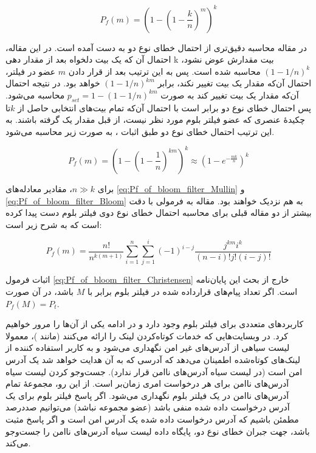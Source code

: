 \begin{equation}
P_f(m) = \left(1-\left(1-\frac{k}{n}\right)^{m}\right)^k \label{eq:Pf_of_bloom_filter_Bloom}
\end{equation}

در مقاله \cite{Mullin1983} محاسبه دقیق‌تری از احتمال خطای نوع دو به دست آمده است. در این مقاله، احتمال آن که یک بیت دلخواه بعد از مقدار دهی k بیت مقدارش عوض نشود،
$(1-1/n)^k$
محاسبه شده است. پس به این ترتیب بعد از قرار دادن $m$ عضو در فیلتر، احتمال آن‌که مقدار یک بیت تغییر نکند، برابر 
$(1-1/n)^{km}$
خواهد بود. در نتیجه احتمال آن‌که مقدار یک بیت تغییر کند به صورت 
$p_{set} = 1-(1-1/n)^{km}$
محاسبه می‌شود. پس احتمال خطای نوع دو برابر است با احتمال آن‌که تمام بیت‌های انتخابی حاصل از $k$تا چکیدهٔ عنصری که عضو فیلتر بلوم مورد نظر نیست،‌ از قبل مقدار یک گرفته باشند. به این ترتیب احتمال خطای نوع دو طبق اثبات \cite{Mullin1983}، به صورت زیر محاسبه می‌شود.

\begin{equation}
P_f(m) = \left(1-\left(1-\frac{1}{n}\right)^{km}\right)^k \approx \left(1-e^{-\frac{mk}{n}}\right)^k
\label{eq:Pf_of_bloom_filter_Mullin}
\end{equation}

برای $n\gg k$، مقادیر معادله‌های  \eqref{eq:Pf_of_bloom_filter_Mullin} و \eqref{eq:Pf_of_bloom_filter_Bloom} به هم نزدیک خواهند بود. مقاله \cite{Christensen2010} به فرمولی با دقت بیشتر از دو مقاله قبلی برای محاسبه احتمال خطای نوع دوی فیلتر بلوم دست پیدا کرده است که به شرح زیر است:

\begin{equation}
P_f(m) = \frac{n!}{n^{k(m+1)}} \sum_{i=1}^{n} \sum_{j=1}^{i} (-1)^{i-j} \frac{j^{km}i^k}{(n-i)!j!(i-j)!}
\label{eq:Pf_of_bloom_filter_Christensen}
\end{equation}


اثبات فرمول \eqref{eq:Pf_of_bloom_filter_Christensen} خارج از بحث این پایان‌نامه است. اگر تعداد پیام‌های قرارداده شده در فیلتر بلوم برابر با $M$ باشد، در آن صورت 
$P_f(M)=P_t$.


کاربرد‌های متعددی برای فیلتر بلوم وجود دارد و در ادامه یکی از آن‌ها را مرور خواهیم کرد. در وبسایت‌هایی که خدمات کوتاه‌کردن لینک را ارائه می‌کنند (مانند \cite{Bitly.comTeam2020})، معمولا لیست سیاهی از آدرس‌های غیر امن نگهداری می‌شود و به کاربر استفاده کننده از لینک‌های کوتاه‌شده اطمینان می‌دهد که آدرسی که به آن هدایت خواهد شد یک آدرس امن است (در لیست سیاه آدرس‌های ناامن قرار ندارد). جست‌وجو کردن لیست سیاه آدرس‌های ناامن برای هر درخواست امری زمان‌بر است. از این رو، مجموعهٔ تمام آدرس‌های ناامن در یک فیلتر بلوم نگهداری می‌شود. اگر پاسخ فیلتر بلوم برای یک آدرس درخواست داده شده منفی باشد (عضو مجموعه نباشد) می‌توانیم صددرصد مطمئن باشیم که آدرس در‌خواست داده شده یک آدرس امن است و اگر پاسخ مثبت باشد،‌ جهت جبران خطای نوع دو، پایگاه‌ داده لیست سیاه آدرس‌های ناامن را جست‌وجو می‌کند\cite{Azar2016}.

